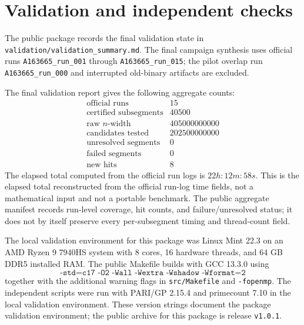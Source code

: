 \documentclass[11pt]{article}
\theoremstyle{definition}
\theoremstyle{remark}
\begin{document}
\section{Validation and independent checks}

The public package records the final validation state in
\texttt{validation/validation\_summary.md}.  The final campaign synthesis
uses official runs \texttt{A163665\_run\_001} through
\texttt{A163665\_run\_015}; the pilot overlap run
\texttt{A163665\_run\_000} and interrupted old-binary artifacts are
excluded.

The final validation report gives the following aggregate counts:
\[
\begin{array}{lr}
\text{official runs} & 15\\
\text{certified subsegments} & 40500\\
\text{raw }n\text{-width} & 405000000000\\
\text{candidates tested} & 202500000000\\
\text{unresolved segments} & 0\\
\text{failed segments} & 0\\
\text{new hits} & 8
\end{array}
\]
The elapsed total computed from the official run logs is \(22h{:}12m{:}58s\).
This is the elapsed total reconstructed from the official run-log time
fields, not a mathematical input and not a portable benchmark.  The
public aggregate manifest records run-level coverage, hit counts, and
failure/unresolved status; it does not by itself preserve every
per-subsegment timing and thread-count field.

The local validation environment for this package was Linux Mint 22.3 on
an AMD Ryzen 9 7940HS system with 8 cores, 16 hardware threads, and
64 GB DDR5 installed RAM.  The public Makefile builds with GCC 13.3.0
using
\[
\texttt{-std=c17 -O2 -Wall -Wextra -Wshadow -Wformat=2}
\]
together with the additional warning flags in \texttt{src/Makefile} and
\texttt{-fopenmp}.  The independent scripts were run with PARI/GP 2.15.4
and primecount 7.10 in the local validation environment.  These version
strings document the package validation environment; the public archive
for this package is release \texttt{v1.0.1}.
\end{document}
